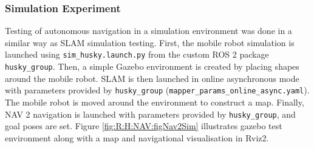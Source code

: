 \subsubsection{Simulation Experiment}
Testing of autonomous navigation in a simulation environment was done in a similar way as SLAM simulation testing. First, the mobile robot simulation is launched using \lstinline{sim_husky.launch.py} from the custom ROS 2 package \lstinline{husky_group}. Then, a simple Gazebo environment is created by placing shapes around the mobile robot. SLAM is then launched in online asynchronous mode with parameters provided by \lstinline{husky_group} (\lstinline{mapper_params_online_async.yaml}). The mobile robot is moved around the environment to construct a map. Finally, NAV 2 navigation is launched with parameters provided by \lstinline{husky_group}, and goal poses are set. Figure \ref{fig:R:H:NAV:figNav2Sim} illustrates gazebo test environment along with a map and navigational visualisation in Rviz2.

